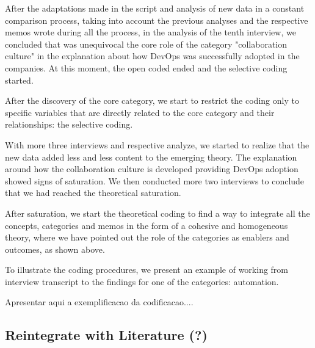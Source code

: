 After the adaptations made in the script and analysis of new data in a constant
comparison process, taking into account the previous analyses and the
respective memos wrote during all the process, in the analysis of the tenth
interview, we concluded that was unequivocal the core role of the
category "collaboration culture" in the explanation about how DevOps was
successfully adopted in the companies. At this moment, the open coded ended
and the selective coding started.

After the discovery of the core category, we start to restrict the coding only
to specific variables that are directly related to the core category and their
relationships: the selective coding.

With more three interviews and respective analyze, we started to realize that
the new data added less and less content to the emerging theory. The
explanation around how the collaboration culture is developed providing
DevOps adoption showed signs of saturation. We then conducted more two
interviews to conclude that we had reached the theoretical saturation.

After saturation, we start the theoretical coding to find a way to integrate
all the concepts, categories and memos in the form of a cohesive and
homogeneous theory, where we have pointed out the role of the categories as
enablers and outcomes, as shown above.

To illustrate the coding procedures, we present an example of working from
interview transcript to the findings for one of the categories: automation.

Apresentar aqui a exemplificacao da codificacao....

\subsection{Reintegrate with Literature (?)}
